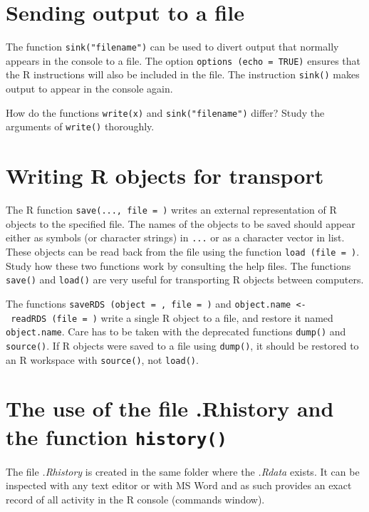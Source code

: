 \documentclass[
]{book}
\begin{document}
\section{Sending output to a file}\label{sending-output-to-a-file}

The function \texttt{sink("filename")} can be used to divert output that normally appears in the console to a file. The option \texttt{options\ (echo\ =\ TRUE)} ensures that the R instructions will also be included in the file. The instruction \texttt{sink()} makes output to appear in the console again.

How do the functions \texttt{write(x)} and \texttt{sink("filename")} differ? Study the arguments of \texttt{write()} thoroughly.

\section{Writing R objects for transport}\label{writing-r-objects-for-transport}

The R function \texttt{save(...,\ file\ =\ )} writes an external representation of R objects to the specified file. The names of the objects to be saved should appear either as symbols (or character strings) in \texttt{...} or as a character vector in list. These objects can be read back from the file using the function \texttt{load\ (file\ =\ )}. Study how these two functions work by consulting the help files. The functions \texttt{save()} and \texttt{load()} are very useful for transporting R objects between computers.

The functions \texttt{saveRDS\ (object\ =\ ,\ file\ =\ )} and \texttt{object.name\ \textless{}-\ readRDS\ (file\ =\ )} write a single R object to a file, and restore it named \texttt{object.name}. Care has to be taken with the deprecated functions \texttt{dump()} and \texttt{source()}. If R objects were saved to a file using \texttt{dump()}, it should be restored to an R workspace with \texttt{source()}, not \texttt{load()}.

\section{\texorpdfstring{The use of the file .Rhistory and the function \texttt{history()}}{The use of the file .Rhistory and the function history()}}\label{the-use-of-the-file-.rhistory-and-the-function-history}

The file \emph{{.Rhistory}} is created in the same folder where the \emph{{.Rdata}} exists. It can be inspected with any text editor or with MS Word and as such provides an exact record of all activity in the R console (commands window).
\end{document}
